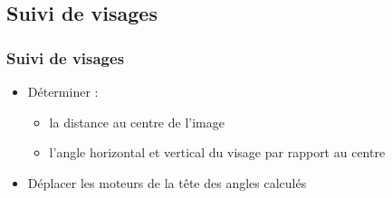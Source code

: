 \subsection{Suivi de visages}
\begin{frame}
  \frametitle{Suivi de visages}
  \begin{itemize}
    \item Déterminer :
      \begin{itemize}
        \item la distance au centre de l'image
        \item l'angle horizontal et vertical du visage par rapport au centre 
      \end{itemize}
    \item Déplacer les moteurs de la tête des angles calculés
  \end{itemize}
\end{frame}
